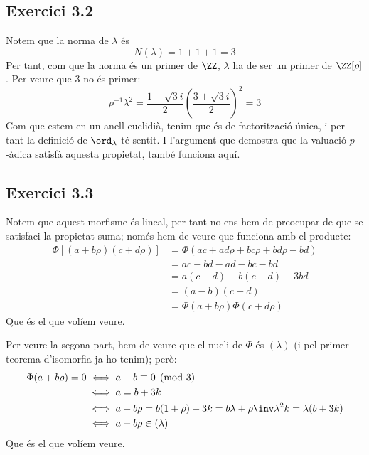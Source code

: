 \documentclass[11pt, a4paper]{article}
\begin{document}
    \subsection{Exercici 3.2}
    Notem que la norma de $\lambda$ és
    \[
    N(\lambda)=1+1+1=3
    \]
    Per tant, com que la norma és un primer de $\ZZ$, $\lambda$ ha de ser un primer de $\ZZ[\rho]$. Per veure que $3$ no és primer:
    \[
        \rho^{-1}\lambda^2=\frac{1-\sqrt 3i}{2}\left(\frac{3+\sqrt{3}i}{2}\right)^2=
        3
    \]
    Com que estem en un anell euclidià, tenim que és de factorització única, i per tant la definició de $\ord_\lambda$ té sentit. I l'argument que demostra que la valuació $p$-àdica satisfà aquesta propietat, també funciona aquí.
    \subsection{Exercici 3.3}
    Notem que aquest morfisme és lineal, per tant no ens hem de preocupar de que se satisfaci la propietat suma; només hem de veure que funciona amb el producte:
    \begin{align*}
        \Phi[(a+b\rho)(c+d\rho)]&=\Phi(ac+ad\rho+bc\rho+bd\rho-bd)\\
        &=ac-bd-ad-bc-bd\\
        &=a(c-d)-b(c-d)-3bd\\
        &=(a-b)(c-d)\\
        &=\Phi(a+b\rho)\Phi(c+d\rho)
    \end{align*}
    Que és el que volíem veure.\par
    Per veure la segona part, hem de veure que el nucli de $\Phi$ és $(\lambda)$ (i pel primer teorema d'isomorfia ja ho tenim); però:
    \begin{align*}
        \Phi(a+b\rho)=0&\iff a-b\equiv 0\pmod 3\\
        &\iff a=b+3k\\
        &\iff a+b\rho=b(1+\rho)+3k=b\lambda+\rho\inv\lambda^2k=\lambda(b+3k)\\
        &\iff a+b\rho\in(\lambda)
    \end{align*}
    Que és el que volíem veure.
\end{document}
